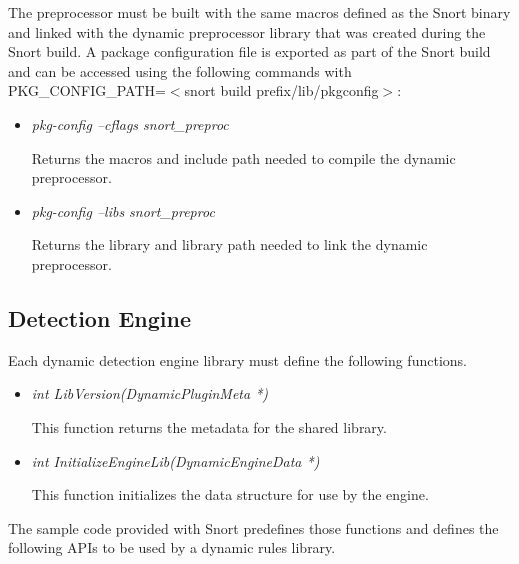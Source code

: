 \documentclass[english]{report}
\begin{document}
The preprocessor must be built with the same macros defined as the Snort binary and
linked with the dynamic preprocessor library that was created during the Snort build.
A package configuration file is exported as part of the Snort build and can be accessed
using the following commands with PKG\_CONFIG\_PATH=$<$snort build prefix/lib/pkgconfig$>$:

\begin{itemize}
\item {\em pkg-config --cflags snort\_preproc}

Returns the macros and include path needed to compile the dynamic preprocessor.

\item {\em pkg-config --libs snort\_preproc}

Returns the library and library path needed to link the dynamic preprocessor.

\end{itemize}

\subsection{Detection Engine}

Each dynamic detection engine library must define the following functions.

\begin{itemize}
\item {\em int LibVersion(DynamicPluginMeta *)}

This function returns the metadata for the shared library.

\item {\em int InitializeEngineLib(DynamicEngineData *)}

This function initializes the data structure for use by the engine.

\end{itemize}

The sample code provided with Snort predefines those functions and defines the
following APIs to be used by a dynamic rules library.
\end{document}
